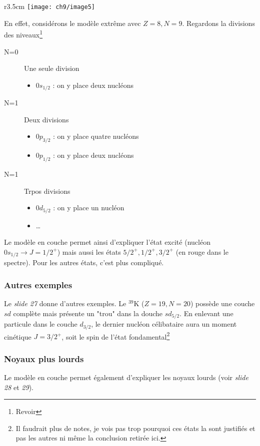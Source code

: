 	\begin{wrapfigure}[10]{r}{3.5cm}
	\vspace{-8mm}
	\texttt{[image: ch9/image5]}
	\end{wrapfigure}
	
En effet, considérons le modèle extrême avec $Z=8, N=9$. Regardons la divisions des niveaux\footnote{Revoir}
\begin{description}
\item[N=0] Une seule division
	\begin{itemize}
	\item $0s_{1/2}$ : on y place deux nucléons
	\end{itemize}
	
\item[N=1] Deux divisions
	\begin{itemize}
	\item $0p_{3/2}$ : on y place quatre nucléons
	\item $0p_{1/2}$ : on y place deux nucléons	
	\end{itemize}	
	
\item[N=1] Trpos divisions
	\begin{itemize}
	\item $0d_{5/2}$ : on y place un nucléon
	\item \dots 
	\end{itemize}		
\end{description}


Le modèle en couche permet ainsi d'expliquer l'état excité (nucléon $0s_{1/2} \to J=1/2^+$) mais aussi les
états $5/2^+,1/2^+,3/2^+$ (en rouge dans le spectre). Pour les autres états, c'est plus compliqué.


\subsubsection*{Autres exemples}
Le \textit{slide 27} donne d'autres exemples. Le $^{39}$K ($Z=19,N=20$) possède une couche $sd$ complète mais
présente un "trou" dans la douche $sd_{5/2}$. En enlevant une particule dans le couche $d_{3/2}$, le dernier 
nucléon célibataire aura un moment cinétique $J=3/2^+$, soit le spin de l'état fondamental\footnote{Il faudrait
plus de notes, je vois pas trop pourquoi ces états la sont justifiés et pas les autres ni même la conclusion
retirée ici.}


\subsubsection*{Noyaux plus lourds}
Le modèle en couche permet également d'expliquer les noyaux lourds (voir \textit{slide 28} et \textit{29}).


